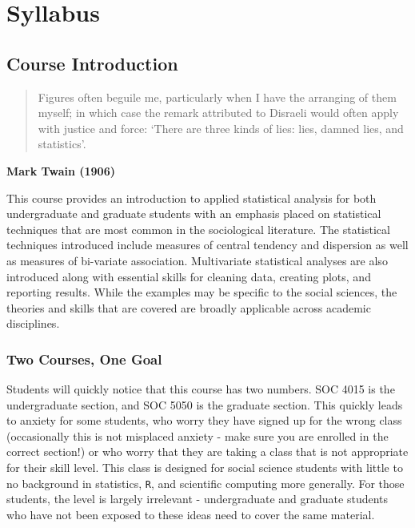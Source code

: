 \documentclass[]{book}
\theoremstyle{definition}
\theoremstyle{definition}
\theoremstyle{definition}
\theoremstyle{remark}
\begin{document}
\hypertarget{part-syllabus}{%
\part{Syllabus}\label{part-syllabus}}

\hypertarget{course-introduction}{%
\chapter{Course Introduction}\label{course-introduction}}

\begin{quote}
Figures often beguile me, particularly when I have the arranging of them
myself; in which case the remark attributed to Disraeli would often
apply with justice and force: `There are three kinds of lies: lies,
damned lies, and statistics'.
\end{quote}

\textbf{Mark Twain (1906)}

This course provides an introduction to applied statistical analysis for
both undergraduate and graduate students with an emphasis placed on
statistical techniques that are most common in the sociological
literature. The statistical techniques introduced include measures of
central tendency and dispersion as well as measures of bi-variate
association. Multivariate statistical analyses are also introduced along
with essential skills for cleaning data, creating plots, and reporting
results. While the examples may be specific to the social sciences, the
theories and skills that are covered are broadly applicable across
academic disciplines.

\hypertarget{two-courses-one-goal}{%
\section{Two Courses, One Goal}\label{two-courses-one-goal}}

Students will quickly notice that this course has two numbers. SOC 4015
is the undergraduate section, and SOC 5050 is the graduate section. This
quickly leads to anxiety for some students, who worry they have signed
up for the wrong class (occasionally this is not misplaced anxiety -
make sure you are enrolled in the correct section!) or who worry that
they are taking a class that is not appropriate for their skill level.
This class is designed for social science students with little to no
background in statistics, \texttt{R}, and scientific computing more
generally. For those students, the level is largely irrelevant -
undergraduate and graduate students who have not been exposed to these
ideas need to cover the same material.
\end{document}
